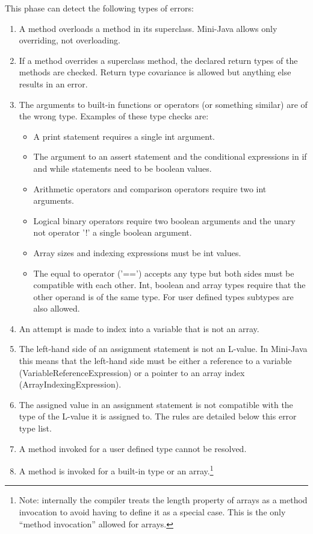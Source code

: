 \documentclass[a4paper,11pt]{article}
\begin{document}
This phase can detect the following types of errors:
\begin{enumerate}
\item A method overloads a method in its superclass. Mini-Java allows only overriding, not overloading.
\item If a method overrides a superclass method, the declared return types of the methods are checked. Return type covariance is allowed but anything else results in an error.
\item The arguments to built-in functions or operators (or something similar) are of the wrong type. Examples of these type checks are:
\begin{itemize}
\item A print statement requires a single int argument.
\item The argument to an assert statement and the conditional expressions in if and while statements need to be boolean values.
\item Arithmetic operators and comparison operators require two int arguments.
\item Logical binary operators require two boolean arguments and the unary not operator '!' a single boolean argument.
\item Array sizes and indexing expressions must be int values.
\item The equal to operator ('==') accepts any type but both sides must be compatible with each other. Int, boolean and array types require that the other operand is of the same type. For user defined types subtypes are also allowed.
\end{itemize}
\item An attempt is made to index into a variable that is not an array.
\item The left-hand side of an assignment statement is not an L-value. In Mini-Java this means that the left-hand side must be either a reference to a variable (VariableReferenceExpression) or a pointer to an array index (ArrayIndexingExpression).
\item The assigned value in an assignment statement is not compatible with the type of the L-value it is assigned to. The rules are detailed below this error type list.
\item A method invoked for a user defined type cannot be resolved.
\item A method is invoked for a built-in type or an array.\footnote{Note: internally the compiler treats the length property of arrays as a method invocation to avoid having to define it as a special case. This is the only ``method invocation'' allowed for arrays.}

\end{enumerate}
\end{document}
